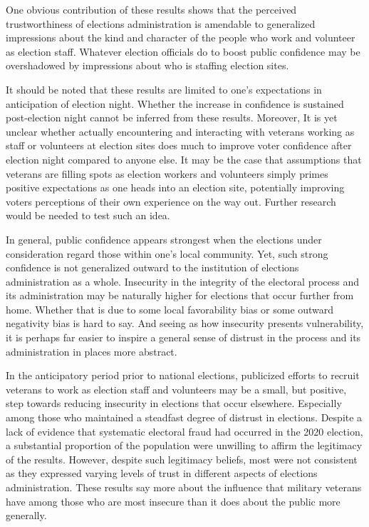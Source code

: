 \documentclass[
  12pt,
  letterpaper,
]{article}
\begin{document}
One obvious contribution of these results shows that the perceived
trustworthiness of elections administration is amendable to generalized
impressions about the kind and character of the people who work and
volunteer as election staff. Whatever election officials do to boost
public confidence may be overshadowed by impressions about who is
staffing election sites.

It should be noted that these results are limited to one's expectations
in anticipation of election night. Whether the increase in confidence is
sustained post-election night cannot be inferred from these results.
Moreover, It is yet unclear whether actually encountering and
interacting with veterans working as staff or volunteers at election
sites does much to improve voter confidence after election night
compared to anyone else. It may be the case that assumptions that
veterans are filling spots as election workers and volunteers simply
primes positive expectations as one heads into an election site,
potentially improving voters perceptions of their own experience on the
way out. Further research would be needed to test such an idea.

In general, public confidence appears strongest when the elections under
consideration regard those within one's local community. Yet, such
strong confidence is not generalized outward to the institution of
elections administration as a whole. Insecurity in the integrity of the
electoral process and its administration may be naturally higher for
elections that occur further from home. Whether that is due to some
local favorability bias or some outward negativity bias is hard to say.
And seeing as how insecurity presents vulnerability, it is perhaps far
easier to inspire a general sense of distrust in the process and its
administration in places more abstract.

In the anticipatory period prior to national elections, publicized
efforts to recruit veterans to work as election staff and volunteers may
be a small, but positive, step towards reducing insecurity in elections
that occur elsewhere. Especially among those who maintained a steadfast
degree of distrust in elections. Despite a lack of evidence that
systematic electoral fraud had occurred in the 2020 election, a
substantial proportion of the population were unwilling to affirm the
legitimacy of the results. However, despite such legitimacy beliefs,
most were not consistent as they expressed varying levels of trust in
different aspects of elections administration. These results say more
about the influence that military veterans have among those who are most
insecure than it does about the public more generally.
\end{document}
